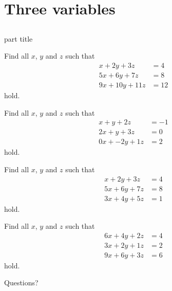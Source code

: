 \documentclass{beamer}
\begin{document}
\section{Three variables}
\subsection{}
\begin{frame}
    \begin{beamercolorbox}[sep=12pt,center]{part title}
      \insertsection\par
    \end{beamercolorbox}
\end{frame}

\begin{frame}
  Find all $x$, $y$ and $z$ such that
  \begin{align*}
    x+2y+3z&=4\\
    5x+6y+7z&=8\\
    9x+10y+11z&=12
  \end{align*}
  hold.
\end{frame}

\begin{frame}
  Find all $x$, $y$ and $z$ such that
  \begin{align*}
    x+y+2z&=-1\\
    2x+y+3z&=0\\
    0x+-2y+1z&=2
  \end{align*}
  hold.
\end{frame}

\begin{frame}
  Find all $x$, $y$ and $z$ such that
  \begin{align*}
    x+2y+3z&=4\\
    5x+6y+7z&=8\\
    3x+4y+5z&=1
  \end{align*}
  hold.
\end{frame}

\begin{frame}
  Find all $x$, $y$ and $z$ such that
  \begin{align*}
    6x+4y+2z&=4\\
    3x+2y+1z&=2\\
    9x+6y+3z&=6
  \end{align*}
  hold.
\end{frame}

\begin{frame}
  Questions?
\end{frame}
\end{document}
